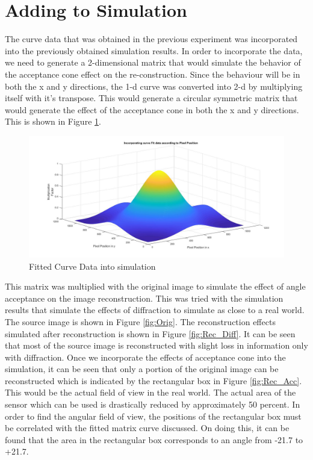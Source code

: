 \section{Adding to Simulation}
The curve data that was obtained in the previous experiment was incorporated into the previously obtained simulation results. In order to incorporate the data, we need to generate a 2-dimensional matrix that would simulate the behavior of the acceptance cone effect on the re-construction. Since the behaviour will be in both the x and y directions, the 1-d curve was converted into 2-d by multiplying itself with it's transpose. This would generate a circular symmetric matrix that would generate the effect of the acceptance cone in both the x and y directions. This is shown in Figure \ref{fig:curve_sim}.
\begin{figure}[!h]
\centering
\includegraphics[scale=0.25]{pics/AcceptanceConeCurveFit.jpg}
\caption{Fitted Curve Data into simulation}
\label{fig:curve_sim}
\end{figure}
This matrix was multiplied with the original image to simulate the effect of angle acceptance on the image reconstruction. This was tried with the simulation results that simulate the effects of diffraction to simulate as close to a real world. The source image is shown in Figure \ref{fig:Orig}. The reconstruction effects simulated after reconstruction is shown in Figure \ref{fig:Rec_Diff}. It can be seen that most of the source image is reconstructed with slight loss in information only with diffraction. Once we incorporate the effects of acceptance cone into the simulation, it can be seen that only a portion of the original image can be reconstructed which is indicated by the rectangular box in Figure \ref{fig:Rec_Acc}. 
This would be the actual field of view in the real world. The actual area of the sensor which can be used is drastically reduced by approximately 50 percent. In order to find the angular field of view, the positions of the rectangular box must be correlated with the fitted matrix curve discussed. On doing this, it can be found that the area in the rectangular box corresponds to an angle from -21.7 to +21.7.

